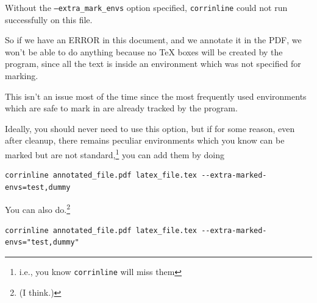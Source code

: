 \documentclass{amsart}
\newenvironment{dummy}{}{}
\newenvironment{test}{}{}
\begin{document}
\begin{dummy}
Without the \texttt{--extra\_mark\_envs} option specified, {\tt corrinline} could not run successfully on this %
file.

So if we have an ERROR in this document, and we annotate it in the PDF, %
we won't be able to do anything because %
no \TeX{} boxes %
will be created by %
the program, since %
all the text is inside an environment which was not specified for %
marking.

This isn't an issue most of the time since the %
most frequently used environments which are safe to mark in are %
already tracked
by %
the %
program.

Ideally, you %
should never need to use this option, but if for some reason, even after cleanup, there remains
peculiar environments which you know can be marked but are %
not standard,\footnote{i.e., you know {\tt corrinline} will miss them} you %
can add %
them by doing
\begin{verbatim}
corrinline annotated_file.pdf latex_file.tex --extra-marked-envs=test,dummy
\end{verbatim}
\end{dummy}
\begin{test}
You %
can %
also do.\footnote{(I think.)} %
\begin{verbatim}
corrinline annotated_file.pdf latex_file.tex --extra-marked-envs="test,dummy"
\end{verbatim}
\end{test}
\end{document}

